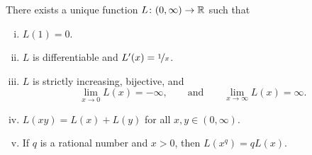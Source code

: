 \begin{prop}
There exists a unique function $L \colon (0,\infty) \to {\mathbb{R}}$ such that
\begin{enumerate}[(i)]
\item \label{it:log:i}
$L(1) = 0$.
\item \label{it:log:ii}
$L$ is differentiable and $L'(x) = \nicefrac{1}{x}$.
\item \label{it:log:iii}
$L$ is strictly increasing, bijective, and
\begin{equation*}
\lim_{x\to 0} L(x) = -\infty , \qquad \text{and} \qquad
\lim_{x\to \infty} L(x) = \infty .
\end{equation*}
\item \label{it:log:iv}
$L(xy) = L(x)+L(y)$ for all $x,y \in (0,\infty)$.
\item \label{it:log:v}
If $q$ is a rational number and $x > 0$, then
$L(x^q) = q L(x)$.
\end{enumerate}
\end{prop}

